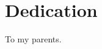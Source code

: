 
\begingroup
\let\clearpage\relax
\let\cleardoublepage\relax
\let\cleardoublepage\relax

\chapter*{Dedication}
\centering
\vspace{150pt}
To my parents.
\vfill


\endgroup			

\vfill




